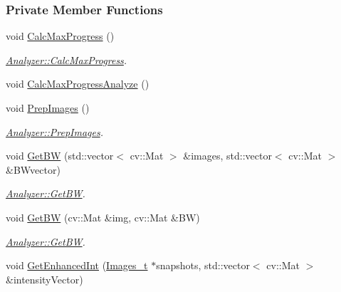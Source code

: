 \subsubsection*{Private Member Functions}
\begin{DoxyCompactItemize}
\item 
void \hyperlink{class_soil_analyzer_1_1_analyzer_a9c4225822dd3c0ff246f5d81cfead0d4}{Calc\+Max\+Progress} ()
\begin{DoxyCompactList}\small\item\em \hyperlink{class_soil_analyzer_1_1_analyzer_a9c4225822dd3c0ff246f5d81cfead0d4}{Analyzer\+::\+Calc\+Max\+Progress}. \end{DoxyCompactList}\item 
void \hyperlink{class_soil_analyzer_1_1_analyzer_a0c9b739e2147ffc18f241e0eb542b487}{Calc\+Max\+Progress\+Analyze} ()
\item 
void \hyperlink{class_soil_analyzer_1_1_analyzer_a5b299a425580620ba409112971bc787e}{Prep\+Images} ()
\begin{DoxyCompactList}\small\item\em \hyperlink{class_soil_analyzer_1_1_analyzer_a5b299a425580620ba409112971bc787e}{Analyzer\+::\+Prep\+Images}. \end{DoxyCompactList}\item 
void \hyperlink{class_soil_analyzer_1_1_analyzer_a13975656889dddd31bb9cff565fd3c9f}{Get\+B\+W} (std\+::vector$<$ cv\+::\+Mat $>$ \&images, std\+::vector$<$ cv\+::\+Mat $>$ \&B\+Wvector)
\begin{DoxyCompactList}\small\item\em \hyperlink{class_soil_analyzer_1_1_analyzer_a13975656889dddd31bb9cff565fd3c9f}{Analyzer\+::\+Get\+B\+W}. \end{DoxyCompactList}\item 
void \hyperlink{class_soil_analyzer_1_1_analyzer_a1ecbbb5125d67ccff940ed3b1a377eb2}{Get\+B\+W} (cv\+::\+Mat \&img, cv\+::\+Mat \&B\+W)
\begin{DoxyCompactList}\small\item\em \hyperlink{class_soil_analyzer_1_1_analyzer_a13975656889dddd31bb9cff565fd3c9f}{Analyzer\+::\+Get\+B\+W}. \end{DoxyCompactList}\item 
void \hyperlink{class_soil_analyzer_1_1_analyzer_a0d15b639bbfa2becde2dbf5605d00757}{Get\+Enhanced\+Int} (\hyperlink{class_soil_analyzer_1_1_analyzer_a55e2c84ab42cb967d718dd18295c1f91}{Images\+\_\+t} $\ast$snapshots, std\+::vector$<$ cv\+::\+Mat $>$ \&intensity\+Vector)

\end{DoxyCompactItemize}
